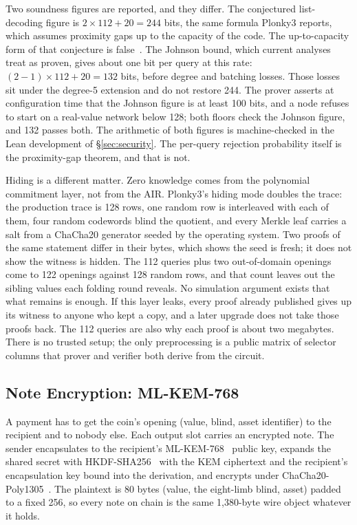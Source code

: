 \documentclass[twocolumn,10pt]{article}
\begin{document}
Two soundness figures are reported, and they differ. The conjectured list-decoding figure is $2\times 112+20 = 244$ bits, the same formula Plonky3 reports, which assumes proximity gaps up to the capacity of the code. The up-to-capacity form of that conjecture is false~\cite{crites2025}. The Johnson bound, which current analyses treat as proven, gives about one bit per query at this rate: $(2-1)\times 112 + 20 = 132$ bits, before degree and batching losses. Those losses sit under the degree-5 extension and do not restore 244. The prover asserts at configuration time that the Johnson figure is at least 100 bits, and a node refuses to start on a real-value network below 128; both floors check the Johnson figure, and 132 passes both. The arithmetic of both figures is machine-checked in the Lean development of \S\ref{sec:security}. The per-query rejection probability itself is the proximity-gap theorem, and that is not.

Hiding is a different matter. Zero knowledge comes from the polynomial commitment layer, not from the AIR. Plonky3's hiding mode doubles the trace: the production trace is 128 rows, one random row is interleaved with each of them, four random codewords blind the quotient, and every Merkle leaf carries a salt from a ChaCha20 generator seeded by the operating system. Two proofs of the same statement differ in their bytes, which shows the seed is fresh; it does not show the witness is hidden. The 112 queries plus two out-of-domain openings come to 122 openings against 128 random rows, and that count leaves out the sibling values each folding round reveals. No simulation argument exists that what remains is enough. If this layer leaks, every proof already published gives up its witness to anyone who kept a copy, and a later upgrade does not take those proofs back. The 112 queries are also why each proof is about two megabytes. There is no trusted setup; the only preprocessing is a public matrix of selector columns that prover and verifier both derive from the circuit.

\subsection{Note Encryption: ML-KEM-768}
\label{sec:kem}

A payment has to get the coin's opening (value, blind, asset identifier) to the recipient and to nobody else. Each output slot carries an encrypted note. The sender encapsulates to the recipient's ML-KEM-768~\cite{fips203} public key, expands the shared secret with HKDF-SHA256~\cite{rfc5869} with the KEM ciphertext and the recipient's encapsulation key bound into the derivation, and encrypts under ChaCha20-Poly1305~\cite{rfc8439}. The plaintext is 80 bytes (value, the eight-limb blind, asset) padded to a fixed 256, so every note on chain is the same 1,380-byte wire object whatever it holds.
\end{document}
